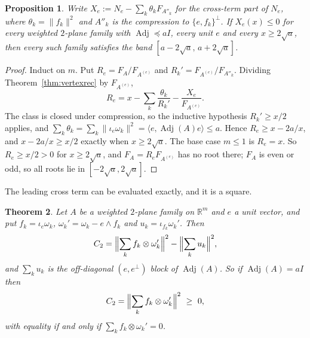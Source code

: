 \documentclass[11pt]{article}
\newtheorem{theorem}{Theorem}
\newtheorem{proposition}[theorem]{Proposition}
\theoremstyle{remark}
\begin{document}
\begin{proposition}\label{prop:cross}
Write $X_e:=N_e-\sum_k\theta_kF_{A''_k}$ for the cross-term part of $N_e$, where
$\theta_k=\|f_k\|^2$ and $A''_k$ is the compression to $\{e,f_k\}^\perp$. If
$X_e(x)\le0$ for every weighted $2$-plane family with $\operatorname{Adj}\preceq aI$,
every unit $e$ and every $x\ge2\sqrt a$, then every such family satisfies the band
$[a-2\sqrt a,\,a+2\sqrt a]$.
\end{proposition}

\begin{proof}
Induct on $m$. Put $R_e=F_A/F_{A^{(e)}}$ and $R_k'=F_{A^{(e)}}/F_{A''_k}$. Dividing
Theorem~\ref{thm:vertexrec} by $F_{A^{(e)}}$,
\[
R_e=x-\sum_k\frac{\theta_k}{R_k'}-\frac{X_e}{F_{A^{(e)}}} .
\]
The class is closed under compression, so the inductive hypothesis $R_k'\ge x/2$
applies, and $\sum_k\theta_k=\sum_k\|\iota_e\omega_k\|^2
=\langle e,\operatorname{Adj}(A)e\rangle\le a$. Hence $R_e\ge x-2a/x$, and
$x-2a/x\ge x/2$ exactly when $x\ge2\sqrt a$. The base case $m\le1$ is $R_e=x$.
So $R_e\ge x/2>0$ for $x\ge2\sqrt a$, and $F_A=R_eF_{A^{(e)}}$ has no root there;
$F_A$ is even or odd, so all roots lie in $[-2\sqrt a,2\sqrt a]$.
\end{proof}

The leading cross term can be evaluated exactly, and it is a square.

\begin{theorem}\label{thm:C2}
Let $A$ be a weighted $2$-plane family on $\mathbb R^m$ and $e$ a unit vector, and put
$f_k=\iota_e\omega_k$, $\omega_k'=\omega_k-e\wedge f_k$ and $u_k=\iota_{f_k}\omega_k'$.
Then
\[
C_2=\Bigl\|\sum_kf_k\otimes\omega_k'\Bigr\|^2-\Bigl\|\sum_ku_k\Bigr\|^2 ,
\]
and $\sum_ku_k$ is the off-diagonal $(e,e^\perp)$ block of $\operatorname{Adj}(A)$. So if
$\operatorname{Adj}(A)=aI$ then
\[
C_2=\Bigl\|\sum_kf_k\otimes\omega_k'\Bigr\|^2\ \ge\ 0,
\]
with equality if and only if $\sum_kf_k\otimes\omega_k'=0$.
\end{theorem}
\end{document}
